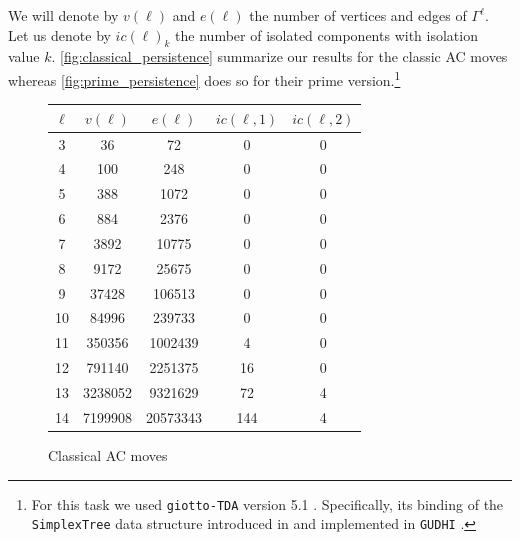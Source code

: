 We will denote by $v(\ell)$ and $e(\ell)$ the number of vertices and edges of $\Gamma^\ell$.
Let us denote by $ic(\ell)_k$ the number of isolated components with isolation value $k$.
\autoref{fig:classical_persistence} summarize our results for the classic AC moves whereas \autoref{fig:prime_persistence} does so for their prime version.\footnote{For this task we used \texttt{giotto-TDA} version 5.1 \cite{tauzin2021giotto}.
	Specifically, its binding of the \texttt{SimplexTree} data structure introduced in \cite{boissonnat2014simplex} and implemented in \texttt{GUDHI} \cite{maria2014gudhi}.}

\begin{figure}
	\begin{tabular}{|c|c|c|c|c|}
		\hline
		$\ell$ & $v(\ell)$ & $e(\ell)$ & $ic(\ell,1)$ & $ic(\ell,2)$ \\ \hline
		3 & 36 & 72 & 0 & 0 \\ \hline
		4 & 100 & 248 & 0 & 0 \\ \hline
		5 & 388 & 1072 & 0 & 0 \\ \hline
		6 & 884 & 2376 & 0 & 0 \\ \hline
		7 & 3892 & 10775 & 0 & 0 \\ \hline
		8 & 9172 & 25675 & 0 & 0 \\ \hline
		9 & 37428 & 106513 & 0 & 0 \\ \hline
		10 & 84996 & 239733 & 0 & 0 \\ \hline
		11 & 350356 & 1002439 & 4 & 0 \\ \hline
		12 & 791140 & 2251375 & 16 & 0 \\ \hline
		13 & 3238052 & 9321629 & 72 & 4 \\ \hline
		14 & 7199908 & 20573343 & 144 & 4 \\ \hline
	\end{tabular}
	\caption{Classical AC moves}
	\label{fig:classical_persistence}
\end{figure}

